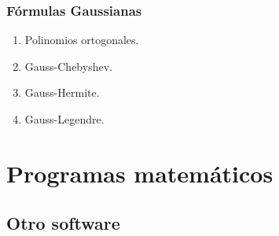 \documentclass[12pt]{beamer}
\begin{document}
\begin{frame}
\frametitle{Fórmulas Gaussianas}
\begin{enumerate}[<+->]
\item Polinomios ortogonales.
\item Gauss-Chebyshev.
\item Gauss-Hermite.
\item Gauss-Legendre.
\end{enumerate}
\end{frame}

\section{Programas matemáticos}
\subsection{Otro software}
\end{document}
